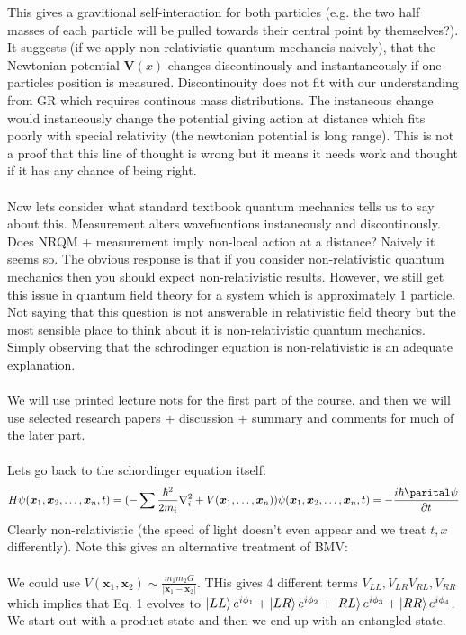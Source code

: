 \documentclass{article}
\begin{document}
       This gives a gravitional self-interaction for both particles (e.g. the two half masses of each particle will be pulled towards their central point by themselves?). It suggests (if we apply non relativistic quantum mechancis naively), that the Newtonian potential $\bm V(x)$ changes discontinously and instantaneously if one particles position is measured. Discontinouity does not fit with our understanding from GR which requires continous mass distributions. The instaneous change would instaneously change the potential giving action at distance which fits poorly with special relativity (the newtonian potential is long range). This is not a proof that this line of thought is wrong but it means it needs work and thought if it has any chance of being right.\\\\
       Now lets consider what standard textbook quantum mechanics tells us to say about this. Measurement alters wavefucntions instaneously and discontinously. Does NRQM + measurement imply non-local action at a distance? Naively it seems so. The obvious response is that if you consider non-relativistic quantum mechanics then you should expect non-relativistic results. However, we still get this issue in quantum field theory for a system which is approximately 1 particle. Not saying that this question is not answerable in relativistic field theory but the most sensible place to think about it is non-relativistic quantum mechanics. Simply observing that the schrodinger equation is non-relativistic  is an adequate explanation. \\\\
       We will use printed lecture nots for the first part of the course, and then we will use selected research papers + discussion + summary and comments for much of the later part. \\\\
       Lets go back to the schordinger equation itself:
       \begin{equation}
               H \psi(\bm x_1, \bm x_2,\ldots, \bm x_n, t) = ( - \sum \frac{\hbar^2}{2m_i} \nabla^2_i + V(\bm x_1,\ldots, \bm x_n) ) \psi(\bm x_1, \bm x_2,\ldots, \bm x_n, t) = - \frac{i \hbar \parital \psi}{\partial t}
       \end{equation}
       Clearly non-relativistic (the speed of light doesn't even appear and we treat $t,x$ differently). Note this gives an alternative treatment of BMV: \\\\
       We could use $V(\bm x_1, \bm x_2) \sim \frac{m_1 m_2 G}{|\bm x_1 - \bm x_2|}$. THis gives 4 different terms $V_{LL}, V_{LR} V_{RL}, V_{RR}$ which implies that Eq. 1 evolves to $\ket{LL} e^{i \phi_1} + \ket{LR} e^{i \phi_2} + \ket{RL} e^{i \phi_3} + \ket{RR} e^{i \phi_4}$. We start out with a product state and then we end up with an entangled state. \\\\
\end{document}
